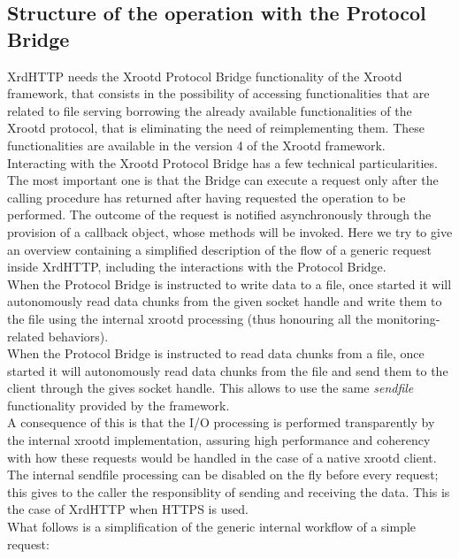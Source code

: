 \documentclass[12pt]{article} %
\begin{document}
\subsection{Structure of the operation with the Protocol Bridge}

XrdHTTP needs the Xrootd Protocol Bridge functionality of the Xrootd framework, that consists in the possibility of accessing functionalities that are related to file serving borrowing the already available functionalities of the Xrootd protocol, that is eliminating the need of reimplementing them. These functionalities are available in the version 4 of the Xrootd framework.\\

Interacting with the Xrootd Protocol Bridge has a few technical particularities.
The most important one is that the Bridge can execute a request only after the calling procedure has returned after having requested the operation to be performed. The outcome of the request is notified asynchronously through the provision of a callback object, whose methods will be invoked. Here we try to give an overview containing a simplified description of the flow of a generic request inside XrdHTTP, including the interactions with the Protocol Bridge.\\

When the Protocol Bridge is instructed to write data to a file, once started it will autonomously read data chunks from the given socket handle and write them to the file using the internal xrootd processing (thus honouring all the monitoring-related behaviors).\\

When the Protocol Bridge is instructed to read data chunks from a file, once started it will autonomously read data chunks from the file and send them to the client through the gives socket handle. This allows to use the same \textit{sendfile} functionality provided by the framework.\\

A consequence of this is that the I/O processing is performed transparently by the internal xrootd implementation, assuring high performance and coherency with how these requests would be handled in the case of a native xrootd client. The internal sendfile processing can be disabled on the fly before every request; this gives to the caller the responsiblity of sending and receiving the data. This is the case of XrdHTTP when HTTPS is used.\\

What follows is a simplification of the generic internal workflow of a simple request:\\
\end{document}
